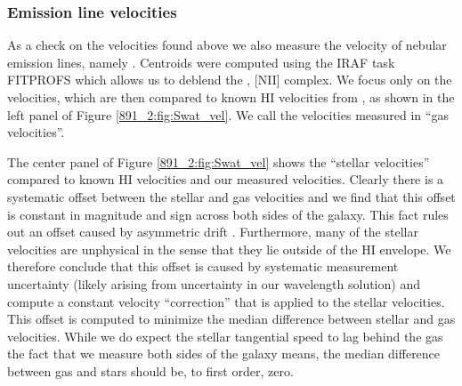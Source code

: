 \subsubsection{Emission line velocities}

As a check on the velocities found above we also measure the velocity
of nebular emission lines, namely \Ha. Centroids were computed using
the IRAF task FITPROFS which allows us to deblend the \Ha, [NII]
complex. We focus only on the \Ha velocities, which are then compared
to known HI velocities from \citet{Swaters97}, as shown in the left
panel of Figure \ref{891_2:fig:Swat_vel}. We call the velocities measured in
\Ha ``gas velocities''.


The center panel of Figure \ref{891_2:fig:Swat_vel} shows the
``stellar velocities'' compared to known HI velocities and our
measured \Ha velocities. Clearly there is a systematic offset between
the stellar and gas velocities and we find that this offset is
constant in magnitude and sign across both sides of the galaxy. This
fact rules out an offset caused by asymmetric drift
\citep{Binney87}. Furthermore, many of the stellar velocities are
unphysical in the sense that they lie outside of the HI envelope. We
therefore conclude that this offset is caused by systematic
measurement uncertainty (likely arising from uncertainty in our
wavelength solution) and compute a constant velocity ``correction''
that is applied to the stellar velocities. This offset is computed to
minimize the median difference between stellar and gas
velocities. While we do expect the stellar tangential speed to lag
behind the gas the fact that we measure both sides of the galaxy
means, the median difference between gas and stars should be, to first
order, zero.


